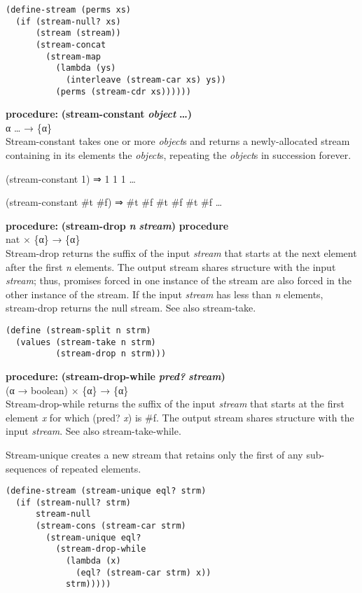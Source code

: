 \begin{verbatim}
(define-stream (perms xs)
  (if (stream-null? xs)
      (stream (stream))
      (stream-concat
        (stream-map
          (lambda (ys)
            (interleave (stream-car xs) ys))
          (perms (stream-cdr xs))))))
\end{verbatim}

\textbf{procedure:} \textbf{(stream-constant} \textbf{\emph{object}}
\textbf{\ldots{})}\\
α \ldots{} → \{α\}\\
Stream-constant takes one or more \emph{object}s and returns a
newly-allocated stream containing in its elements the \emph{object}s,
repeating the \emph{object}s in succession forever.

(stream-constant 1) ⇒ 1 1 1 \ldots{}

(stream-constant \#t \#f) ⇒ \#t \#f \#t \#f \#t \#f \ldots{}

\textbf{procedure:} \textbf{(stream-drop} \textbf{\emph{n}} \textbf{}
\textbf{\emph{stream})} \textbf{procedure}\\
nat × \{α\} → \{α\}\\
Stream-drop returns the suffix of the input \emph{stream} that starts at
the next element after the first \emph{n} elements. The output stream
shares structure with the input \emph{stream}; thus, promises forced in
one instance of the stream are also forced in the other instance of the
stream. If the input \emph{stream} has less than \emph{n} elements,
stream-drop returns the null stream. See also stream-take.

\begin{verbatim}
(define (stream-split n strm)
  (values (stream-take n strm)
          (stream-drop n strm)))
\end{verbatim}

\textbf{procedure:} \textbf{(stream-drop-while} \textbf{\emph{pred?}}
\textbf{} \textbf{\emph{stream})}\\
(α → boolean) × \{α\} → \{α\}\\
Stream-drop-while returns the suffix of the input \emph{stream} that
starts at the first element \emph{x} for which (pred? \emph{x}) is \#f.
The output stream shares structure with the input \emph{stream}. See
also stream-take-while.

Stream-unique creates a new stream that retains only the first of any
sub-sequences of repeated elements.

\begin{verbatim}
(define-stream (stream-unique eql? strm)
  (if (stream-null? strm)
      stream-null
      (stream-cons (stream-car strm)
        (stream-unique eql?
          (stream-drop-while
            (lambda (x)
              (eql? (stream-car strm) x))
            strm)))))
\end{verbatim}

